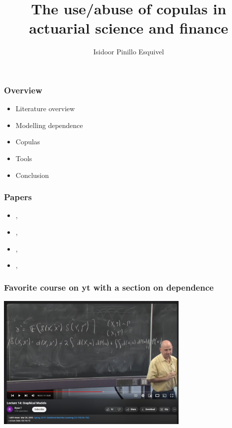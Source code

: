 \documentclass[18pt,aspectratio=149]{beamer}
\title{The use/abuse of copulas in actuarial science and finance}
\author{Isidoor Pinillo Esquivel}
\date{}
\begin{document}
\begin{frame}
    \titlepage
\end{frame}
\begin{frame}
    \frametitle{Overview}
    \begin{itemize}
        \item Literature overview
        \item Modelling dependence
        \item Copulas
        \item Tools
        \item Conclusion
    \end{itemize}
\end{frame}

\begin{frame}
    \frametitle{Papers}
    \begin{itemize}
        \item {},\\ \textcite{dempster_correlation_2002}
        \item {},\\ \textcite{frees_understanding_1998}
        \item {},\\ \textcite{donnelly_devil_nodate}
        \item {},\\ \textcite{lopez-paz_dependence_2016}
    \end{itemize}

\end{frame}

\begin{frame}
    \frametitle{Favorite course on yt with a section on dependence}
    \begin{center}
        \includegraphics[width=0.7\textwidth]{graphical models yt.jpg}
    \end{center}
\end{frame}
\end{document}
